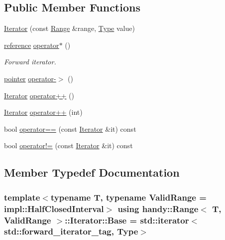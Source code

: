 \subsection*{Public Member Functions}
\begin{DoxyCompactItemize}
\item 
\hyperlink{classhandy_1_1Range_1_1Iterator_a5eb5d28d949109bb56b42eff6be76372}{Iterator} (const \hyperlink{classhandy_1_1Range}{Range} \&range, \hyperlink{classhandy_1_1Range_a2a8c2d169657c93464989e7608ed3f9b}{Type} value)
\item 
\hyperlink{classhandy_1_1Range_1_1Iterator_ab182b2493e468efbced9983e3e38dbe4}{reference} \hyperlink{classhandy_1_1Range_1_1Iterator_a9e860c6771882cb760d1bc394294cc15}{operator$\ast$} ()
\begin{DoxyCompactList}\small\item\em Forward iterator. \end{DoxyCompactList}\item 
\hyperlink{classhandy_1_1Range_1_1Iterator_a2a4a02c25dce296702ceb66fe75f9918}{pointer} \hyperlink{classhandy_1_1Range_1_1Iterator_a2edb437146413ea9114ec92b02cee8bc}{operator-\/$>$} ()
\item 
\hyperlink{classhandy_1_1Range_1_1Iterator}{Iterator} \hyperlink{classhandy_1_1Range_1_1Iterator_ab813ce87299a9ac40a26f0027854c6e4}{operator++} ()
\item 
\hyperlink{classhandy_1_1Range_1_1Iterator}{Iterator} \hyperlink{classhandy_1_1Range_1_1Iterator_aeea6305a195e7f3d9b09204fbf7c1448}{operator++} (int)
\item 
bool \hyperlink{classhandy_1_1Range_1_1Iterator_a38fa4d55b0f9dda5cd2af504a909cef1}{operator==} (const \hyperlink{classhandy_1_1Range_1_1Iterator}{Iterator} \&it) const 
\item 
bool \hyperlink{classhandy_1_1Range_1_1Iterator_afa581bd5ba90ea8930361e287283a820}{operator!=} (const \hyperlink{classhandy_1_1Range_1_1Iterator}{Iterator} \&it) const 
\end{DoxyCompactItemize}


\subsection{Member Typedef Documentation}
\subsubsection[{\texorpdfstring{Base}{Base}}]{\setlength{\rightskip}{0pt plus 5cm}template$<$typename T, typename Valid\+Range = impl\+::\+Half\+Closed\+Interval$>$ using {\bf handy\+::\+Range}$<$ T, Valid\+Range $>$\+::{\bf Iterator\+::\+Base} =  {\bf std\+::iterator}$<${\bf std\+::forward\+\_\+iterator\+\_\+tag}, {\bf Type}$>$}\hypertarget{classhandy_1_1Range_1_1Iterator_ae982d471802ac0e3746e326c3aa2fc14}{}\label{classhandy_1_1Range_1_1Iterator_ae982d471802ac0e3746e326c3aa2fc14}
